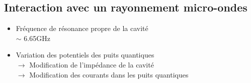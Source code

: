 \documentclass[8pt,a9paper]{beamer} \usepackage[utf8]{inputenc} \usepackage[francais]{babel} \usepackage[T1]{fontenc}
\begin{document}
\subsection{Interaction avec un rayonnement micro-ondes}
\begin{frame}
\begin{itemize}
    \item Fréquence de résonance propre de la cavité\\
        $\sim$ 6.65GHz
    \item Variation des potentiels des puits quantiques\\
    $\rightarrow$ Modification de l'impédance de la cavité\\
    $\rightarrow$ Modification des courants dans les puits quantiques
\end{itemize}


\end{frame}
\end{document}
